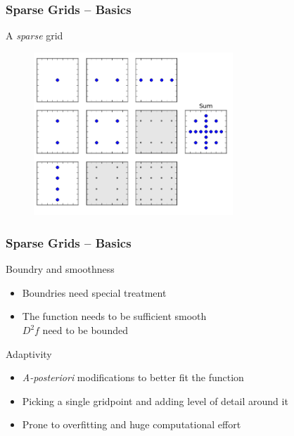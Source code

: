 \begin{frame}
  \frametitle{Sparse Grids -- Basics}
  \topline
  \vspace{-10px}
  \begin{block}{A \emph{sparse} grid}
    \begin{figure}[!htp]
      \centering
      \includegraphics[width=7.5cm]{images/sparsegrid_hirach2}
      \vspace{-12px}
      \caption{}
    \end{figure}
  \end{block}
\end{frame}

\begin{frame}
  \frametitle{Sparse Grids -- Basics}
  \topline
  \vspace{-10px}
  \begin{block}{Boundry and smoothness}
    \begin{itemize}
      \item Boundries need special treatment
      \item The function needs to be sufficient smooth \\
        $D^2f$ need to be bounded
      \end{itemize}
  \end{block}
  \begin{block}{Adaptivity}
    \begin{itemize}
      \item \emph{A-posteriori} modifications to better fit the function
      \item Picking a single gridpoint and adding level of detail around it
      \item Prone to overfitting and huge computational effort
      \end{itemize}
  \end{block}
\end{frame}

